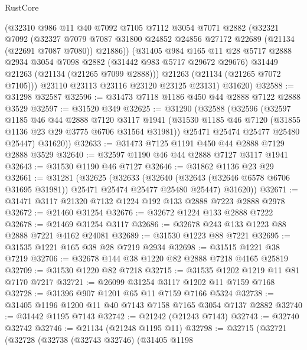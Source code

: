 \begin{lexlean}{RustCore}
\begin{coremodule}
        (@32310
          @986
          @11
          @40
          @7092
          @7105
          @7112
          @3054
          @7071
          @2882
          (@32321
            @7092
            (@32327
              @7079
              @7087
              @31800
              @24852
              @24856
              @27172
              @22689
              (@21134 (@22691 @7087 @7080))
              @21886))
          (@31405
            @984
            @165
            @11
            @28
            @5717
            @2888
            @2934
            @3054
            @7098
            @2882
            (@31442 @983 @5717 @29672 @29676)
            @31449
            @21263
            (@21134 (@21265 @7099 @2888)))
          @21263
          (@21134 (@21265 @7072 @7105)))
        @23110
        @23113
        @23116
        @23120
        @23125
        @23131)
      @31620)
@32588 := @31298 @32587
@32596 := @31473 @7118 @1186 @450 @44 @2888 @7122 @2888 @3529
@32597 := @31520 @349
@32625 := @31290
    (@32588
      (@32596
        (@32597
          @1185
          @46
          @44
          @2888
          @7120
          @3117
          @1941
          (@31530 @1185 @46 @7120 (@31855 @1136 @23 @29 @3775 @6706 @31564 @31981))
          @25471
          @25474
          @25477
          @25480
          @25447)
        @31620))
@32633 := @31473 @7125 @1191 @450 @44 @2888 @7129 @2888 @3529
@32640 := @32597 @1190 @46 @44 @2888 @7127 @3117 @1941
@32643 := @31530 @1190 @46 @7127
@32646 := @31862 @1136 @23 @29
@32661 := @31281
    (@32625
      (@32633
        (@32640 (@32643 (@32646 @6578 @6706 @31695 @31981)) @25471 @25474 @25477 @25480 @25447)
        @31620))
@32671 := @31471 @3117 @21320 @7132 @1224 @192 @133 @2888 @7223 @2888 @2978
@32672 := @21460 @31254
@32676 := @32672 @1224 @133 @2888 @7222
@32678 := @21469 @31254 @3117
@32686 := @32678 @243 @133 @1223 @88 @2888 @7221 @4162 @24081
@32689 := @31530 @1223 @88 @7221
@32695 := @31535 @1221 @165 @38 @28 @7219 @2934
@32698 := @31515 @1221 @38 @7219
@32706 := @32678 @144 @38 @1220 @82 @2888 @7218 @4165 @25819
@32709 := @31530 @1220 @82 @7218
@32715 := @31535 @1202 @1219 @11 @81 @7170 @7217
@32721 := @26099 @31254 @3117 @1202 @11 @7159 @7168
@32728 := @31396 @907 @1201 @65 @11 @7159 @7166 @5324
@32738 := @31405 @1196 @1200 @11 @40 @7143 @7158 @7165 @3054 @7137 @2882
@32740 := @31442 @1195 @7143
@32742 := @21242 (@21243 @7143)
@32743 := @32740 @32742
@32746 := @21134 (@21248 @1195 @11)
@32798 := @32715
    (@32721
      (@32728
        (@32738
          (@32743 @32746)
          (@31405
            @1198

\end{coremodule}
\end{lexlean}
